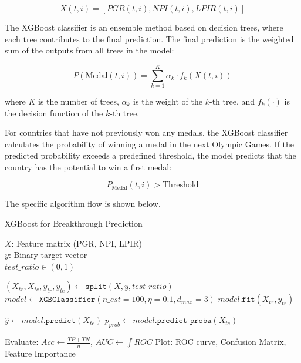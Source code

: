 \documentclass{mcmthesis}
\begin{document}
\[
X(t,i) = [PGR(t,i), NPI(t,i), LPIR(t,i)]
\]

The XGBoost classifier is an ensemble method based on decision trees, where each tree contributes to the final prediction. The final prediction is the weighted sum of the outputs from all trees in the model:

\[
P(\text{Medal}(t,i)) = \sum_{k=1}^{K} \alpha_k \cdot f_k(X(t,i))
\]

where \( K \) is the number of trees, \( \alpha_k \) is the weight of the \( k \)-th tree, and \( f_k(\cdot) \) is the decision function of the \( k \)-th tree.


For countries that have not previously won any medals, the XGBoost classifier calculates the probability of winning a medal in the next Olympic Games. If the predicted probability exceeds a predefined threshold, the model predicts that the country has the potential to win a first medal:

\[
P_{\text{Medal}}(t,i) > \text{Threshold}
\]

The specific algorithm flow is shown below.
\begin{algorithm}[H]
	\caption{XGBoost for Breakthrough Prediction}
	\label{alg:xgboost_short}
	\begin{algorithmic}[1]
		\Require 
		$X$: Feature matrix (PGR, NPI, LPIR) \\
		$y$: Binary target vector \\
		$\mathit{test\_ratio} \in (0,1)$
		
		\State $(X_{\mathit{tr}}, X_{\mathit{te}}, y_{\mathit{tr}}, y_{\mathit{te}}) \gets \texttt{split}(X, y, \mathit{test\_ratio})$
		\State $\mathit{model} \gets \texttt{XGBClassifier}(n\_est=100, \eta=0.1, d_{max}=3)$
		\State $\mathit{model}.\texttt{fit}(X_{\mathit{tr}}, y_{\mathit{tr}})$
		
		\State $\hat{y} \gets \mathit{model}.\texttt{predict}(X_{\mathit{te}})$
		\State $p_{\mathit{prob}} \gets \mathit{model}.\texttt{predict\_proba}(X_{\mathit{te}})$
		
		\State Evaluate: $\mathit{Acc} \gets \frac{\mathit{TP+TN}}{n}$, $\mathit{AUC} \gets \int \mathit{ROC}$
		\State Plot: ROC curve, Confusion Matrix, Feature Importance
		\EndProcedure
	\end{algorithmic}
\end{algorithm}
\end{document}
